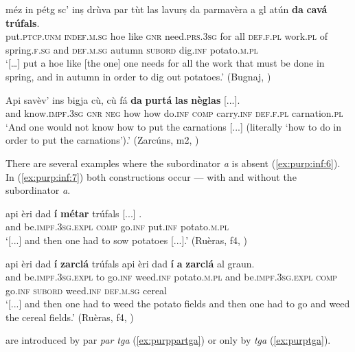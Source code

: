 \ea
\label{ex:purp:inf:4}
\gll  [...] méz in pétg sc’ inṣ drùva par tùt las lavurṣ da parmavèra a gl atún \textbf{da} \textbf{cavá} \textbf{trúfals}.\\
{} put.\textsc{ptcp.unm} \textsc{indef.m.sg} hoe like \textsc{gnr} need.\textsc{prs.3sg} for all \textsc{def.f.pl} work.\textsc{pl} of spring.\textsc{f.sg} and \textsc{def.m.sg} autumn \textsc{subord} dig.\textsc{inf} potato.\textsc{m.pl}\\
\glt `[…] put a hoe like [the one] one needs for all the work that must be done in spring, and in autumn in order to dig out potatoes.' (Bugnaj, \citealt[143]{Büchli1966})
\z

\ea
\label{ex:purp:inf:5}
\gll    Api savèv’ ins bigja cù, cù fá \textbf{da} \textbf{purtá} \textbf{las} \textbf{nèglas} [...].\\
and know.\textsc{impf.3sg} \textsc{gnr} \textsc{neg} how how do.\textsc{inf} \textsc{comp} carry.\textsc{inf} \textsc{def.f.pl} carnation.\textsc{pl}\\
\glt `And one would not know how to put the carnations [...] (literally `how to do in order to put the carnations').' (Zarcúns, m2, )
\z

There are several examples where the subordinator \textit{a} is absent (\ref{ex:purp:inf:6}). In (\ref{ex:purp:inf:7}) both constructions occur — with and without the subordinator \textit{a}.

\ea
\label{ex:purp:inf:6}
	\gll [...] api èri dad \textbf{í} \longrule {} \textbf{métar} trúfals [...] .\\
{} and be.\textsc{impf.3sg.expl} \textsc{comp} go.\textsc{inf} {}  put.\textsc{inf} potato.\textsc{m.pl}\\
\glt `[...] and then one had to sow potatoes [...].' (Ruèras, f4, )
\z

\ea
\label{ex:purp:inf:7}
\gll [...] api èri dad \textbf{í} \longrule {} \textbf{zarclá} trúfals api èri dad \textbf{í} \textbf{a} \textbf{zarclá} al graun.   \\
{} and be.\textsc{impf.3sg.expl} to go.\textsc{inf} {} weed.\textsc{inf} potato.\textsc{m.pl} and be.\textsc{impf.3sg.expl} \textsc{comp} go.\textsc{inf} \textsc{subord} weed.\textsc{inf} \textsc{def.m.sg} cereal\\
\glt `[...] and then one had to weed the potato fields and then one had to go and weed the cereal fields.' (Ruèras, f4, )
\z

 are introduced by par \textit{par tga} (\ref{ex:purppartga}) or only by \textit{tga} (\ref{ex:purptga}).

